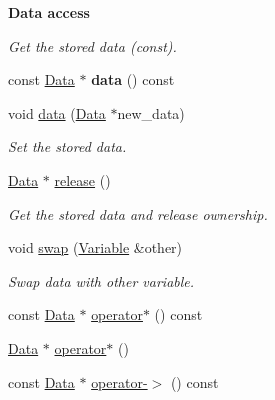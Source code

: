 \begin{Indent}{\bf Data access}\par
{\em Get the stored data (const). }\begin{DoxyCompactItemize}
\item 
const \hyperlink{classcreek_1_1_data}{Data} $\ast$ {\bfseries data} () const \hypertarget{classcreek_1_1_variable_a5666d32781079c71d0e830b64910cf5a}{}\label{classcreek_1_1_variable_a5666d32781079c71d0e830b64910cf5a}

\item 
void \hyperlink{classcreek_1_1_variable_a3461d66f8111ee0ac767a049f62c5c5d}{data} (\hyperlink{classcreek_1_1_data}{Data} $\ast$new\+\_\+data)\hypertarget{classcreek_1_1_variable_a3461d66f8111ee0ac767a049f62c5c5d}{}\label{classcreek_1_1_variable_a3461d66f8111ee0ac767a049f62c5c5d}

\begin{DoxyCompactList}\small\item\em Set the stored data. \end{DoxyCompactList}\item 
\hyperlink{classcreek_1_1_data}{Data} $\ast$ \hyperlink{classcreek_1_1_variable_a42c62499b81c44051c6e0da9db9ad6e4}{release} ()\hypertarget{classcreek_1_1_variable_a42c62499b81c44051c6e0da9db9ad6e4}{}\label{classcreek_1_1_variable_a42c62499b81c44051c6e0da9db9ad6e4}

\begin{DoxyCompactList}\small\item\em Get the stored data and release ownership. \end{DoxyCompactList}\item 
void \hyperlink{classcreek_1_1_variable_a7365831106e7c58a8746c30dfc3bff18}{swap} (\hyperlink{classcreek_1_1_variable}{Variable} \&other)\hypertarget{classcreek_1_1_variable_a7365831106e7c58a8746c30dfc3bff18}{}\label{classcreek_1_1_variable_a7365831106e7c58a8746c30dfc3bff18}

\begin{DoxyCompactList}\small\item\em Swap data with other variable. \end{DoxyCompactList}\item 
const \hyperlink{classcreek_1_1_data}{Data} $\ast$ \hyperlink{classcreek_1_1_variable_ac4f0711cccf62c1eb8a294d12a478e5e}{operator$\ast$} () const 
\item 
\hyperlink{classcreek_1_1_data}{Data} $\ast$ \hyperlink{classcreek_1_1_variable_acb32627b1a813bb4ffe7ffbcca6bf859}{operator$\ast$} ()
\item 
const \hyperlink{classcreek_1_1_data}{Data} $\ast$ \hyperlink{classcreek_1_1_variable_a53b1647f1af439b8c74d91af252c9c03}{operator-\/$>$} () const \hypertarget{classcreek_1_1_variable_a53b1647f1af439b8c74d91af252c9c03}{}\label{classcreek_1_1_variable_a53b1647f1af439b8c74d91af252c9c03}


\end{DoxyCompactItemize}
\end{Indent}
